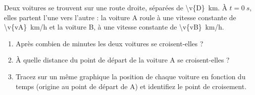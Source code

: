 Deux voitures se trouvent sur une route droite, séparées de \qty{\v{D}}{km}. À $t = \qty{0}{s}$, elles partent l'une vers l'autre : la voiture A roule à une vitesse constante de \qty{\v{vA}}{km/h} et la voiture B, à une vitesse constante de \qty{\v{vB}}{km/h}.

\begin{enumerate}[label=\alph*)]
    \item Après combien de minutes les deux voitures se croisent-elles ?
    \item À quelle distance du point de départ de la voiture A se croisent-elles ?
    \item Tracez sur un même graphique la position de chaque voiture en fonction du temps (origine au point de départ de A) et identifiez le point de croisement.
\end{enumerate}
